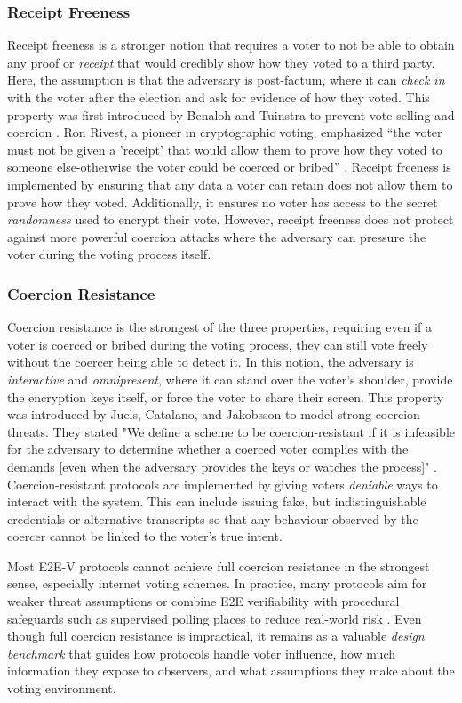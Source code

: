 \subsubsection{Receipt Freeness}
Receipt freeness is a stronger notion that requires a voter to not be able to obtain any proof or \emph{receipt} that would credibly show how they voted to a third party.
Here, the assumption is that the adversary is post-factum, where it can \emph{check in} with the voter after the election and ask for evidence of how they voted. 
This property was first introduced by Benaloh and Tuinstra to prevent vote-selling and coercion \cite{BT94}.
Ron Rivest, a pioneer in cryptographic voting, emphasized ``the voter must not be given a 'receipt' that would allow them to prove how they voted to someone else-otherwise the voter could be coerced or bribed'' \cite{RS07}.
Receipt freeness is implemented by ensuring that any data a voter can retain does not allow them to prove how they voted.
Additionally, it ensures no voter has access to the secret \emph{randomness} used to encrypt their vote. 
However, receipt freeness does not protect against more powerful coercion attacks where the adversary can pressure the voter during the voting process itself.

\subsubsection{Coercion Resistance}
Coercion resistance is the strongest of the three properties, requiring even if a voter is coerced or bribed during the voting process, they can still vote freely without the coercer being able to detect it.
In this notion, the adversary is \emph{interactive} and \emph{omnipresent}, where it can stand over the voter's shoulder, provide the encryption keys itself, or force the voter to share their screen.
This property was introduced by Juels, Catalano, and Jakobsson to model strong coercion threats.
They stated "We define a scheme to be coercion-resistant if it is infeasible for the adversary to determine whether a coerced voter complies with the demands [even when the adversary provides the keys or watches the process]" \cite{haines2019surveying}.
Coercion-resistant protocols are implemented by giving voters \emph{deniable} ways to interact with the system.
This can include issuing fake, but indistinguishable credentials or alternative transcripts so that any behaviour observed by the coercer cannot be linked to the voter's true intent.

Most E2E-V protocols cannot achieve full coercion resistance in the strongest sense, especially internet voting schemes.
In practice, many protocols aim for weaker threat assumptions or combine E2E verifiability with procedural safeguards such as supervised polling places to reduce real-world risk \cite{255242}.
Even though full coercion resistance is impractical, it remains as a valuable \emph{design benchmark} that guides how protocols handle voter influence, how much information they expose to observers, and what assumptions they make about the voting environment.


